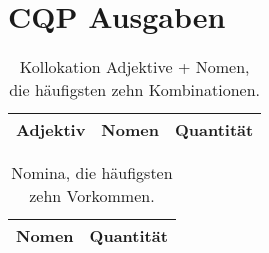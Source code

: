 









\section{CQP Ausgaben}

\begin{table}[htpb]\label{t}
	\center
	\begin{tabularx}{0.6\textwidth}{llr}
		\toprule
		\textbf{Adjektiv} & \textbf{Nomen} & \textbf{Quantität}\\
		\midrule
		
		\bottomrule
	\end{tabularx}
	\caption{Kollokation Adjektive + Nomen, die häufigsten zehn Kombinationen.}
	\label{tab:undefined}
\end{table}

\begin{table}[htpb]\label{t}
	\center
	\begin{tabularx}{0.35\textwidth}{lr}
		\toprule
		\textbf{Nomen} & \textbf{Quantität}\\
		\midrule
		
		\bottomrule
	\end{tabularx}
	\caption{Nomina, die häufigsten zehn Vorkommen.}
	\label{tab:undefined}
\end{table}

